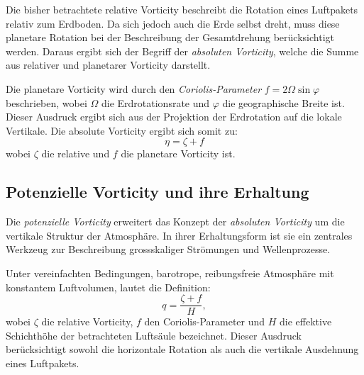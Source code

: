 Die bisher betrachtete relative Vorticity beschreibt die Rotation eines
Luftpakets relativ zum Erdboden. Da sich jedoch auch die Erde selbst dreht,
muss diese planetare Rotation bei der Beschreibung der Gesamtdrehung
berücksichtigt werden. Daraus ergibt sich der Begriff der \emph{absoluten
	Vorticity}, welche die Summe aus relativer und planetarer Vorticity darstellt.

Die planetare Vorticity wird durch den \emph{Coriolis-Parameter} \(
f = 2 \Omega \sin \varphi \) beschrieben, wobei \( \Omega \) die
Erdrotationsrate und \( \varphi \) die geographische Breite ist. Dieser
Ausdruck ergibt sich aus der Projektion der Erdrotation auf die lokale
Vertikale. Die absolute Vorticity ergibt sich somit zu:
\begin{equation}
	\eta = \zeta + f
	\label{rossby:eq:absolute_vorticity}
\end{equation}
wobei \( \zeta \) die relative und \( f \) die planetare Vorticity ist.


\subsection{Potenzielle Vorticity und ihre Erhaltung}

Die \emph{potenzielle Vorticity} erweitert das Konzept der \emph{absoluten
	Vorticity} um die vertikale Struktur der Atmosphäre. In ihrer Erhaltungsform
ist sie ein zentrales Werkzeug zur Beschreibung grossskaliger Strömungen und
Wellenprozesse.

Unter vereinfachten Bedingungen, barotrope, reibungsfreie Atmosphäre mit
konstantem Luftvolumen, lautet die Definition:
\begin{equation}
	q = \frac{\zeta + f}{H},
	\label{rossby:eq:potential_vorticity}
\end{equation}
wobei \(\zeta\) die relative Vorticity, \(f\) den Coriolis-Parameter und \(H\) die effektive Schichthöhe der betrachteten Luftsäule bezeichnet.
Dieser Ausdruck berücksichtigt sowohl die horizontale Rotation als auch die vertikale Ausdehnung eines Luftpakets.




